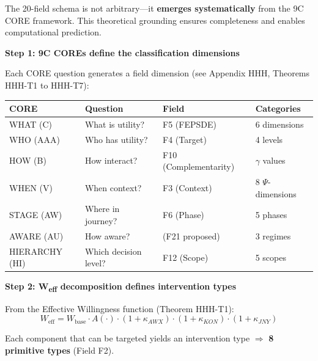 The 20-field schema is not arbitrary---it \textbf{emerges systematically} from the 9C CORE framework. This theoretical grounding ensures completeness and enables computational prediction.

\begin{tcolorbox}[colback=blue!5!white, colframe=blue!75!black,
    title=\textbf{The Emergence Architecture}]

\textbf{Step 1: 9C COREs define the classification dimensions}

Each CORE question generates a field dimension (see Appendix HHH, Theorems HHH-T1 to HHH-T7):

\begin{center}
\renewcommand{\arraystretch}{1.2}
\begin{tabular}{@{}llll@{}}
\toprule
\textbf{CORE} & \textbf{Question} & \textbf{Field} & \textbf{Categories} \\
\midrule
WHAT (C) & What is utility? & F5 (FEPSDE) & 6 dimensions \\
WHO (AAA) & Who has utility? & F4 (Target) & 4 levels \\
HOW (B) & How interact? & F10 (Complementarity) & $\gamma$ values \\
WHEN (V) & When context? & F3 (Context) & 8 $\Psi$-dimensions \\
STAGE (AW) & Where in journey? & F6 (Phase) & 5 phases \\
AWARE (AU) & How aware? & (F21 proposed) & 3 regimes \\
HIERARCHY (HI) & Which decision level? & F12 (Scope) & 5 scopes \\
\bottomrule
\end{tabular}
\end{center}

\textbf{Step 2: W\textsubscript{eff} decomposition defines intervention types}

From the Effective Willingness function (Theorem HHH-T1):
\begin{equation}
W_{\text{eff}} = W_{\text{base}} \cdot A(\cdot) \cdot (1 + \kappa_{AWX}) \cdot (1 + \kappa_{KON}) \cdot (1 + \kappa_{JNY})
\end{equation}

Each component that can be targeted yields an intervention type $\Rightarrow$ \textbf{8 primitive types} (Field F2).

\end{tcolorbox}

